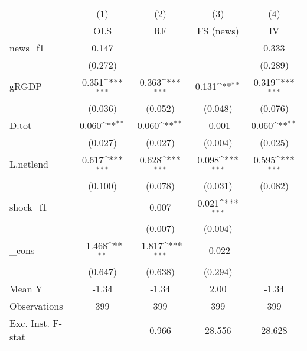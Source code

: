 {
\def\sym#1{\ifmmode^{#1}\else\(^{#1}\)\fi}
\begin{tabular}{l*{4}{c}}
\toprule
            &\multicolumn{1}{c}{(1)}&\multicolumn{1}{c}{(2)}&\multicolumn{1}{c}{(3)}&\multicolumn{1}{c}{(4)}\\
            &\multicolumn{1}{c}{OLS}&\multicolumn{1}{c}{RF}&\multicolumn{1}{c}{FS (news)}&\multicolumn{1}{c}{IV}\\
\midrule
news\_f1     &       0.147         &                     &                     &       0.333         \\
            &     (0.272)         &                     &                     &     (0.289)         \\
\addlinespace
gRGDP       &       0.351\sym{***}&       0.363\sym{***}&       0.131\sym{**} &       0.319\sym{***}\\
            &     (0.036)         &     (0.052)         &     (0.048)         &     (0.076)         \\
\addlinespace
D.tot       &       0.060\sym{**} &       0.060\sym{**} &      -0.001         &       0.060\sym{**} \\
            &     (0.027)         &     (0.027)         &     (0.004)         &     (0.025)         \\
\addlinespace
L.netlend   &       0.617\sym{***}&       0.628\sym{***}&       0.098\sym{***}&       0.595\sym{***}\\
            &     (0.100)         &     (0.078)         &     (0.031)         &     (0.082)         \\
\addlinespace
shock\_f1    &                     &       0.007         &       0.021\sym{***}&                     \\
            &                     &     (0.007)         &     (0.004)         &                     \\
\addlinespace
\_cons      &      -1.468\sym{**} &      -1.817\sym{***}&      -0.022         &                     \\
            &     (0.647)         &     (0.638)         &     (0.294)         &                     \\
\midrule
Mean Y      &       -1.34         &       -1.34         &        2.00         &       -1.34         \\
Observations&         399         &         399         &         399         &         399         \\
Exc. Inst. F-stat&                     &       0.966         &      28.556         &      28.628         \\
\bottomrule
\end{tabular}
}
